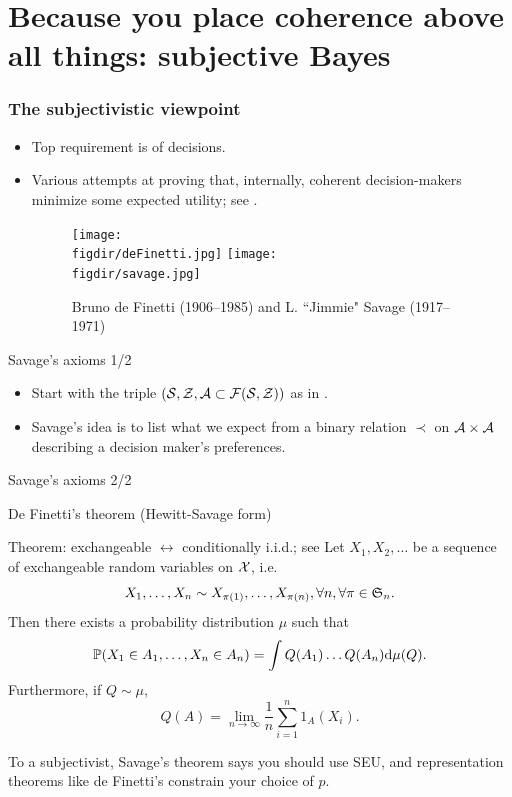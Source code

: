 \documentclass[10pt]{beamer}
\begin{document}
\section{Because you place coherence above all things: subjective Bayes}
\begin{frame}
  \frametitle{The subjectivistic viewpoint}
  \begin{itemize}
    \item Top requirement is  of decisions.
    \item Various attempts at proving that, internally, coherent decision-makers minimize some expected utility; see \citep{PaIn09}.
    \begin{figure}
      \centering
      \texttt{[image: \\figdir/deFinetti.jpg]}
      \texttt{[image: \\figdir/savage.jpg]}
      \caption{Bruno de Finetti (1906--1985) and L. ``Jimmie" Savage (1917--1971)}
    \end{figure}
  \end{itemize}
\end{frame}

\begin{frame}{Savage's axioms 1/2}
\begin{itemize}
\item Start with the triple $(\mathcal{S},\mathcal{Z},\mathcal{A}\subset \mathcal{F}(\mathcal{S}, \mathcal{Z}))$ as in \cite{Wal50}.
\item Savage's idea is to list what we expect from a binary relation $\prec$ on $\mathcal{A}\times \mathcal{A}$ describing a decision maker's preferences.
\end{itemize}
\blank
\blank
\end{frame}

\begin{frame}{Savage's axioms 2/2}
\end{frame}

\begin{frame}{De Finetti's theorem (Hewitt-Savage form)}
  \begin{block}{Theorem: exchangeable $\leftrightarrow$ conditionally i.i.d.; see \citep[Theorem 1.49]{Sch95}}
    Let $X_1,X_2,\dots$ be a sequence of exchangeable random variables on $\mathcal{X}$, i.e.
    $$
    X_1,\dots,X_n \sim X_{\pi(1)},\dots, X_{\pi(n)}, \forall n, \forall \pi\in\frak S_n.
    $$
    Then there exists a probability distribution $\mu$  such that
    $$
    \mathbb P (X_1\in A_1, \dots, X_n\in A_n) = \int Q(A_1)\dots Q(A_n){\rm d}\mu(Q).
    $$
    Furthermore, if $Q\sim\mu$,
    $$
    Q(A) = \lim_{n\rightarrow\infty} \frac 1n\sum_{i=1}^n 1_A(X_i).
    $$
  \end{block}
  To a subjectivist, Savage's theorem says you should use SEU, and representation theorems like de Finetti's constrain your choice of $p$.
\end{frame}
\end{document}
